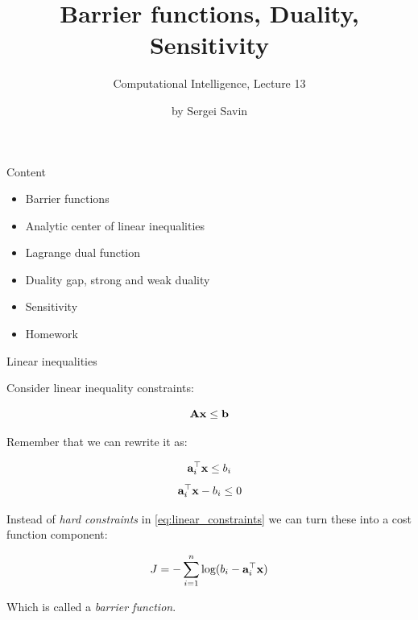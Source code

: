 \documentclass{beamer}
\title{Barrier functions, Duality, Sensitivity}
\subtitle{Computational Intelligence, Lecture 13}
\author{by Sergei Savin}
\date{\mydate}
\begin{document}
\maketitle


\begin{frame}{Content}

\begin{itemize}
\item Barrier functions
\item Analytic center of linear inequalities
\item Lagrange dual function
\item Duality gap, strong and weak duality
\item Sensitivity
\item Homework
\end{itemize}

\end{frame}



\begin{frame}{Linear inequalities}
\begin{flushleft}

Consider linear inequality constraints:

\begin{equation}
    \mathbf{A}\mathbf{x} \leq \mathbf{b}
\end{equation}

Remember that we can rewrite it as:

\begin{equation}
    \mathbf{a}_i^\top \mathbf{x} \leq b_i
\end{equation}
\begin{equation}
\label{eq:linear_constraints}
    \mathbf{a}_i^\top \mathbf{x} - b_i \leq 0
\end{equation}

Instead of \emph{hard constraints} in \eqref{eq:linear_constraints} we can turn these into a cost function component:

\begin{equation}
    J = -\sum\limits_{i = 1}^n \text{log} (b_i - \mathbf{a}_i^\top \mathbf{x})
\end{equation}

Which is called a \emph{barrier function}.
 
\end{flushleft}
\end{frame}
\end{document}
